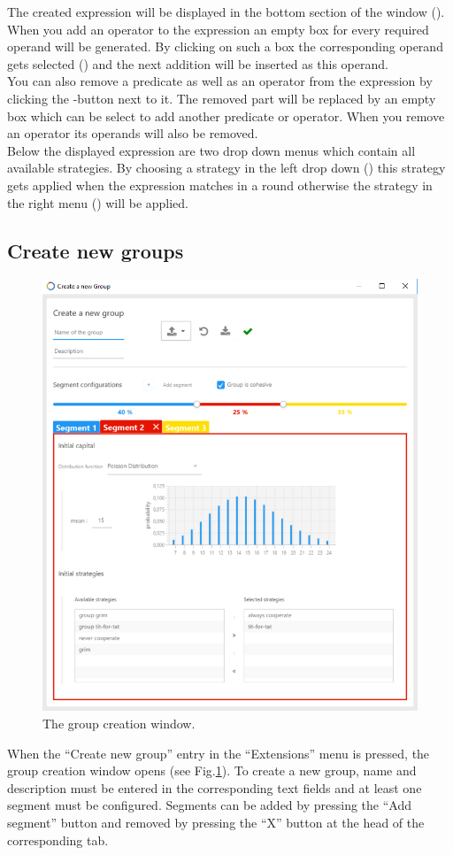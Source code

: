 \documentclass[parskip=full,11pt]{scrartcl}
\newcommand*\circled[1]{\tikz[baseline=(char.base)]{
            \node[shape=circle,draw,inner sep=2pt] (char) {#1};}}
\newlength\myheight
\newlength\mydepth
\newcommand*\inlinegraphics[1]{%
  \settototalheight\myheight{Xygp}%
  \settodepth\mydepth{Xygp}%
  \raisebox{-1.8\mydepth}{\texttt{[image: \#1]}}%
}
\begin{document}
The created expression will be displayed in the bottom section of the window (\circled{3}). When you add an operator to the expression an empty box for every required operand will be generated. By clicking on such a box the corresponding operand gets selected (\circled{4}) and the next addition will be inserted as this operand. 
\\
You can also remove a predicate as well as an operator from the expression by clicking the \inlinegraphics{img_manual/close_button.png}-button next to it. The removed part will be replaced by an empty box which can be select to add another predicate or operator. When you remove an operator its operands will also be removed.
\\
Below the displayed expression are two drop down menus which contain all available strategies. By choosing a strategy in the left drop down (\circled{5}) this strategy gets applied when the expression matches in a round otherwise the strategy in the right menu (\circled{6}) will be applied.

\subsection{Create new groups}
\begin{figure}
	\centering
	\includegraphics[width=0.8\linewidth]{img_manual/group_window.png}
	\caption{The group creation window.}
	\label{fig:group_window}
\end{figure}
When the \enquote{Create new group} entry in the \enquote{Extensions} menu is pressed, the group creation window opens (see Fig.\ref{fig:group_window}). To create a new group, name and description must be entered in the corresponding text fields and at least one segment must be configured. Segments can be added by pressing the \enquote{Add segment} button and removed by pressing the \enquote{X} button at the head of the corresponding tab.
\end{document}
